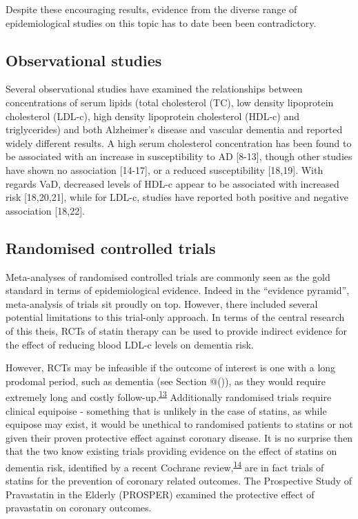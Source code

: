 \documentclass[a4paper, twoside]{templates/ociamthesis}
\begin{document}
Despite these encouraging results, evidence from the diverse range of epidemiological studies on this topic has to date been been contradictory.

\hypertarget{observational-studies}{%
\subsection{Observational studies}\label{observational-studies}}

Several observational studies have examined the relationships between concentrations of serum lipids (total cholesterol (TC), low density lipoprotein cholesterol (LDL-c), high density lipoprotein cholesterol (HDL-c) and triglycerides) and both Alzheimer's disease and vascular dementia and reported widely different results. A high serum cholesterol concentration has been found to be associated with an increase in susceptibility to AD {[}8-13{]}, though other studies have shown no association {[}14-17{]}, or a reduced susceptibility {[}18,19{]}. With regards VaD, decreased levels of HDL-c appear to be associated with increased risk {[}18,20,21{]}, while for LDL-c, studies have reported both positive and negative association {[}18,22{]}.

\hypertarget{randomised-controlled-trials}{%
\subsection{Randomised controlled trials}\label{randomised-controlled-trials}}

Meta-analyses of randomised controlled trials are commonly seen as the gold standard in terms of epidemiological evidence. Indeed in the ``evidence pyramid'', meta-analysis of trials sit proudly on top. However, there included several potential limitations to this trial-only approach. In terms of the central research of this theis, RCTs of statin therapy can be used to provide indirect evidence for the effect of reducing blood LDL-c levels on dementia risk.





However, RCTs may be infeasible if the outcome of interest is one with a long prodomal period, such as dementia (see Section @()), as they would require extremely long and costly follow-up.\textsuperscript{\protect\hyperlink{ref-ritchie2015}{13}} Additionally randomised trials require clinical equipoise - something that is unlikely in the case of statins, as while equipose may exist, it would be unethical to randomised patients to statins or not given their proven protective effect against coronary disease. It is no surprise then that the two know existing trials providing evidence on the effect of statins on dementia risk, identified by a recent Cochrane review,\textsuperscript{\protect\hyperlink{ref-mcguinness2016a}{14}} are in fact trials of statins for the prevention of coronary related outcomes. The Prospective Study of Pravastatin in the Elderly (PROSPER) examined the protective effect of pravastatin on coronary outcomes.
\end{document}

